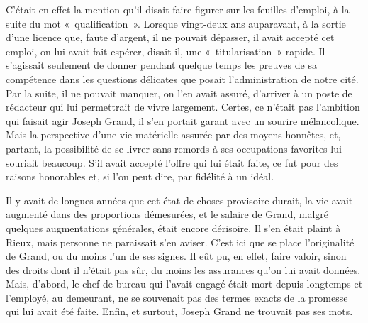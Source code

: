 \documentclass[french,twoside]{book} %
\begin{document}
C’était en effet la mention qu’il disait faire figurer sur les feuilles d’emploi, à la suite du mot « qualification ». Lorsque vingt-deux ans auparavant, à la sortie d’une licence que, faute d’argent, il ne pouvait dépasser, il avait accepté cet emploi, on lui avait fait espérer, disait-il, une « titularisation » rapide. Il s’agissait seulement de donner pendant quelque temps les preuves de sa compétence dans les questions délicates que posait l’administration de notre cité. Par la suite, il ne pouvait manquer, on l’en avait assuré, d’arriver à un poste de rédacteur qui lui permettrait de vivre largement. Certes, ce n’était pas l’ambition qui faisait agir Joseph Grand, il s’en portait garant avec un sourire mélancolique. Mais la perspective d’une vie matérielle assurée par des moyens honnêtes, et, partant, la possibilité de se livrer sans remords à ses occupations favorites lui souriait beaucoup. S’il avait accepté l’offre qui lui était faite, ce fut pour des raisons honorables et, si l’on peut dire, par fidélité à un idéal.\par
Il y avait de longues années que cet état de choses provisoire durait, la vie avait augmenté dans des proportions démesurées, et le salaire de Grand, malgré quelques augmentations générales, était encore dérisoire. Il s’en était plaint à Rieux, mais personne ne paraissait s’en aviser. C’est ici que se place l’originalité de Grand, ou du moins l’un de ses signes. Il eût pu, en effet, faire valoir, sinon des droits dont il n’était pas sûr, du moins les assurances qu’on lui avait données. Mais, d’abord, le chef de bureau qui l’avait engagé était mort depuis longtemps et l’employé, au demeurant, ne se souvenait pas des termes exacts de la promesse qui lui avait été faite. Enfin, et surtout, Joseph Grand ne trouvait pas ses mots.\par
\end{document}
